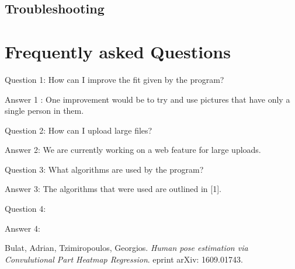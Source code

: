 \documentclass{scrreprt}
\begin{document}
\subsection{Troubleshooting}

\section{Frequently asked Questions}

Question 1: How can I improve the fit given by the program?

Answer 1 : One improvement would be to try and use pictures that have only a single person in them. 

Question 2: How can I upload large files?

Answer 2: We are currently working on a web feature for large uploads.

Question 3: What algorithms are used by the program?

Answer 3: The algorithms that were used are outlined in [1].

Question 4:

Answer 4:

\begin{thebibliography}{9}

Bulat, Adrian, Tzimiropoulos, Georgios. 
\textit{Human pose estimation via Convulutional Part Heatmap Regression}. 
eprint arXiv: 1609.01743.

\end{thebibliography}
\end{document}
